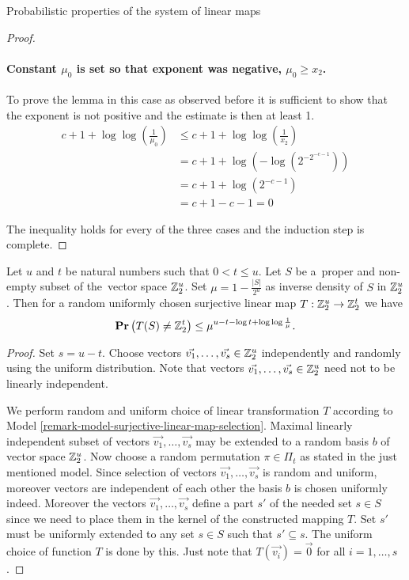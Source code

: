 \begin{section}{Probabilistic properties of the system of linear maps}
\begin{proof}
\paragraph{Constant $\mu_0$ is set so that exponent was negative, $\mu_0 \geq x_2$.}
To prove the lemma in this case as observed before it is sufficient to show that the exponent is not positive and the estimate is then at least 1.
\[
\begin{split}
	c + 1 + \log \log \left( \frac{1}{\mu_0} \right) 
		& \leq c + 1 + \log \log \left( \frac{1}{x_2} \right) \\ 
		& = c + 1 + \log \left(- \log \left(2 ^ {-2 ^ {-c - 1}}\right)\right) \\ 
		& = c + 1 + \log \left(2 ^ {-c - 1}\right) \\ 
		& = c + 1 - c - 1 = 0
\end{split}
\]

The inequality holds for every of the three cases and the induction step is complete.
\end{proof}

\begin{theorem}
\label{theorem-linear-function-set-onto}
Let $u$ and $t$ be natural numbers such that $0 < t \leq u$. Let $S$ be a~proper and non-empty subset of the~vector space $\mathbb{Z}_{2}^{u}$. Set $\mu = 1 - \frac{|S|}{2^u}$ as inverse density of $S$ in $\mathbb{Z}_{2}^{u}$. Then for a random uniformly chosen surjective linear map $T: \mathbb{Z}_{2}^{u} \rightarrow \mathbb{Z}_{2}^{t}$ we have
\[
	\mathbf{Pr}\left(T(S) \neq \mathbb{Z}_{2}^{t}\right) \leq \mu^{u - t - \log t + \log \log \frac{1}{\mu}} \textit{.}
\]
\end{theorem}
\begin{proof}
Set $s = u - t$. Choose vectors $\vec{v_1}, \dots, \vec{v_s} \in \mathbb{Z}_{2}^{u}$ independently and randomly using the uniform distribution. Note that vectors $\vec{v_1}, \dots, \vec{v_s} \in \mathbb{Z}_{2}^{u}$ need not to be linearly independent.

We perform random and uniform choice of linear transformation $T$ according to Model \ref{remark-model-surjective-linear-map-selection}. Maximal linearly independent subset of vectors $\vec{v_1}, \dots, \vec{v_s}$ may be extended to a random basis $b$ of vector space $\mathbb{Z}_{2}^{u}$. Now choose a random permutation $\pi \in \Pi_t$ as stated in the just mentioned model. Since selection of vectors $\vec{v_1}, \dots, \vec{v_s}$ is random and uniform, moreover vectors are independent of each other the basis $b$ is chosen uniformly indeed. Moreover the vectors $\vec{v_1}, \dots, \vec{v_s}$ define a part $s'$ of the needed set $s \in S$ since we need to place them in the kernel of the constructed mapping $T$. Set $s'$ must be uniformly extended to any set $s \in S$ such that $s' \subseteq s$. The uniform choice of function $T$ is done by this. Just note that $T(\vec{v_i}) = \vec{0}$ for all $i = 1, \dots, s$.	


\end{proof}
\end{section}

